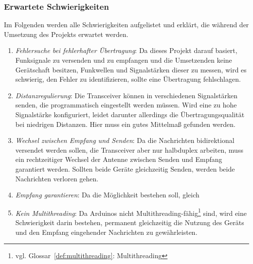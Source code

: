 \documentclass[a4paper, 11pt]{scrartcl}
\begin{document}
\subsubsection{Erwartete Schwierigkeiten}
Im Folgenden werden alle Schwierigkeiten aufgelistet und erklärt, die während der Umsetzung des Projekts erwartet werden.
\begin{enumerate}
    \item \textit{Fehlersuche bei fehlerhafter Übertragung}: Da dieses Projekt darauf basiert, Funksignale zu versenden und zu empfangen und die Umsetzenden keine Gerätschaft
            besitzen, Funkwellen und Signalstärken dieser zu messen, wird es schwierig, den Fehler zu identifizieren, sollte eine Übertragung fehlschlagen.
    \item \textit{Distanzregulierung}: Die Transceiver können in verschiedenen Signalstärken senden, die programmatisch eingestellt werden müssen.
            Wird eine zu hohe Signalstärke konfiguriert, leidet darunter allerdings die Übertragungsqualität bei niedrigen Distanzen. Hier muss ein gutes Mittelmaß
            gefunden werden.
    \item \textit{Wechsel zwischen Empfang und Senden}: Da die Nachrichten bidirektional versendet werden sollen, die Transceiver aber nur halbduplex arbeiten,
            muss ein rechtzeitiger Wechsel der Antenne zwischen Senden und Empfang garantiert werden. Sollten beide Geräte gleichzeitig Senden, werden beide Nachrichten
            verloren gehen.
    \item \textit{Empfang garantieren}: Da die Möglichkeit bestehen soll, gleich 
    \item \textit{Kein Multithreading}: Da Arduinos nicht Multithreading-fähig\footnote{vgl. Glossar~\ref{def:multithreading}: Multithreading} sind, wird eine Schwierigkeit
            darin bestehen, permanent gleichzeitig die Nutzung des Geräts und den Empfang eingehender Nachrichten zu gewährleisten.
\end{enumerate}
\end{document}
